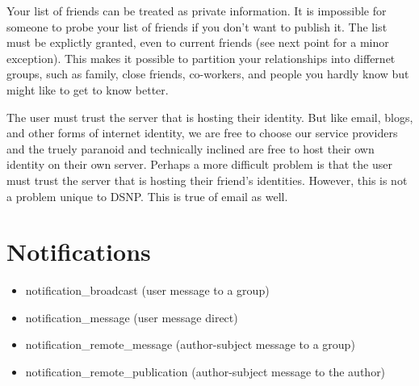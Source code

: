 \documentclass[letterpaper,11pt,oneside]{article}
\begin{document}
Your list of friends can be treated as private information. It is impossible
for someone to probe your list of friends if you don't want to publish it.
The list must be explictly granted, even to current friends (see next point
for a minor exception). This makes it possible to partition your
relationships into differnet groups, such as family, close friends,
co-workers, and people you hardly know but might like to get to know better.

The user must trust the server that is hosting their identity. But like email,
blogs, and other forms of internet identity, we are free to choose our service
providers and the truely paranoid and technically inclined are free to host
their own identity on their own server. Perhaps a more difficult problem is
that the user must trust the server that is hosting their friend's identities.
However, this is not a problem unique to DSNP. This is true of email as well.

\section{Notifications}

\begin{itemize}
\item notification\_broadcast           (user message to a group)
\item notification\_message             (user message direct)
\item notification\_remote\_message     (author-subject message to a group)
\item notification\_remote\_publication (author-subject message to the author)
\end{itemize}
\end{document}
